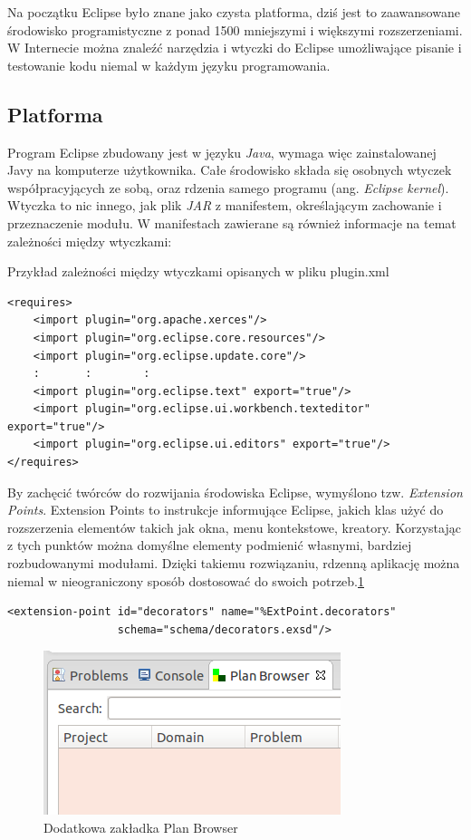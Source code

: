 Na początku Eclipse było znane jako czysta platforma, dziś jest to zaawansowane środowisko programistyczne z ponad 1500 mniejszymi i większymi rozszerzeniami. W Internecie można znaleźć narzędzia i wtyczki do Eclipse umożliwające pisanie i testowanie kodu niemal w każdym języku programowania.

\subsection{Platforma}

Program Eclipse zbudowany jest w języku \emph{Java}, wymaga więc zainstalowanej Javy na komputerze użytkownika.  Całe środowisko składa się osobnych wtyczek współpracyjących ze sobą, oraz rdzenia samego programu (ang. \emph{Eclipse kernel}). Wtyczka to nic innego, jak plik \emph{JAR} z manifestem, określającym zachowanie i przeznaczenie modułu. W manifestach zawierane są również informacje na temat zależności między wtyczkami:

Przykład zależności między wtyczkami opisanych w pliku plugin.xml
\begin{verbatim}
<requires>
	<import plugin="org.apache.xerces"/>
	<import plugin="org.eclipse.core.resources"/>
	<import plugin="org.eclipse.update.core"/>
	:       :        :
	<import plugin="org.eclipse.text" export="true"/>
	<import plugin="org.eclipse.ui.workbench.texteditor" export="true"/>
	<import plugin="org.eclipse.ui.editors" export="true"/>
</requires>
\end{verbatim}

By zachęcić twórców do rozwijania środowiska Eclipse, wymyślono tzw. \emph{Extension Points}. Extension Points to instrukcje informujące Eclipse, jakich klas użyć do rozszerzenia elementów takich jak okna, menu kontekstowe, kreatory. Korzystając z tych punktów można domyślne elementy podmienić własnymi, bardziej rozbudowanymi modułami. Dzięki takiemu rozwiązaniu, rdzenną aplikację można niemal w nieograniczony sposób dostosować do swoich potrzeb.\ref{ana_structure}

\begin{verbatim}
<extension-point id="decorators" name="%ExtPoint.decorators"
                 schema="schema/decorators.exsd"/>
\end{verbatim}

\begin{figure}[h]
  \centering
    \includegraphics{img/custom-window.png}
    \caption{Dodatkowa zakładka Plan Browser}
    \label{ana_structure}
\end{figure}

